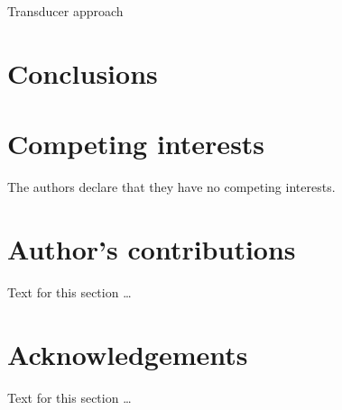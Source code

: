\documentclass{bmcart}
\begin{document}
Transducer approach \cite{Westesson2012-zg,BouchardCote2013,IndelHistorian}


\section*{Conclusions}

\cite{RivasEddy2015}

\cite{Ezawa2016a}

\cite{Ezawa2016b,Ezawa2016bErratum}



\begin{backmatter}

\section*{Competing interests}
  The authors declare that they have no competing interests.

\section*{Author's contributions}
    Text for this section \ldots

\section*{Acknowledgements}
  Text for this section \ldots


\end{backmatter}
\end{document}
